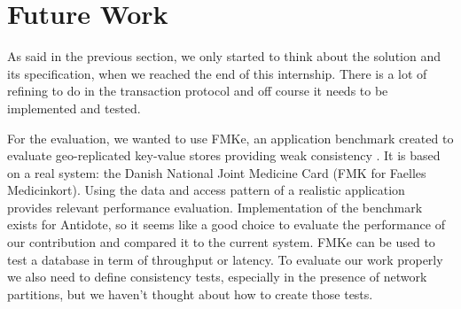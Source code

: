 \documentclass[11pt]{article}
\begin{document}
%
%
%
%
%
%

\section{Future Work}
As said in the previous section, we only started to think about the solution
and its specification, when we reached the end of this internship. There is a
lot of refining to do in the transaction protocol and off course it needs to
be implemented and tested.

For the evaluation, we wanted to use FMKe, an application benchmark created to
evaluate geo-replicated key-value stores providing weak consistency
\cite{FMKE2017}. It is based on a real system: the Danish National Joint
Medicine Card (FMK for Faelles Medicinkort). Using the data and access pattern
of a realistic application provides relevant performance evaluation.
Implementation of the benchmark exists for Antidote, so it seems like a good
choice to evaluate the performance of our contribution and compared it to the
current system. FMKe can be used to test a database in term of throughput or
latency. To evaluate our work properly we also need to define consistency
tests, especially in the presence of network partitions, but we haven't
thought about how to create those tests.
\end{document}
